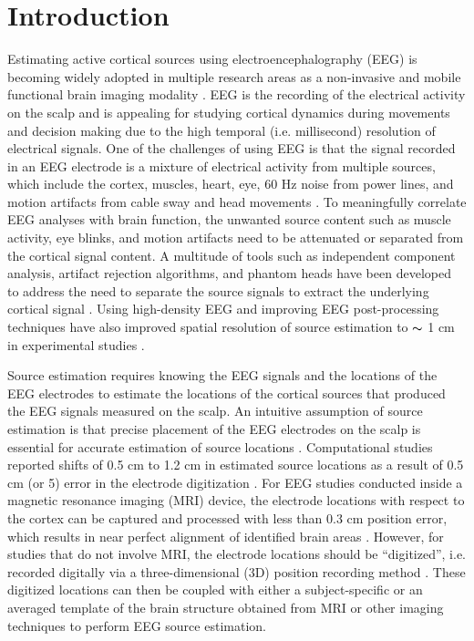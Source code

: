 \documentclass{UCF_ETD}
\renewcommand{\ul}{}
\begin{document}
\section{Introduction}
Estimating active cortical sources using electroencephalography (EEG) is becoming widely adopted in multiple research areas as a non-invasive and mobile functional brain imaging modality  \citep{Tsolaki2017-nt,Bradley2016-wg,Landsness2011-mr,Nystrom2008-ex}. EEG is the recording of the electrical activity on the scalp and is appealing for studying cortical dynamics during movements and decision making due to the high temporal (i.e. millisecond) resolution of electrical signals. One of the challenges of using EEG is that the signal recorded in an EEG electrode is a mixture of electrical activity from multiple sources, which include the cortex, muscles, heart, eye, 60 Hz noise from power lines, and motion artifacts from cable sway and head movements \citep{Kline2015-mf,Symeonidou2018-ge}. To meaningfully correlate EEG analyses with brain function, the unwanted source content such as muscle activity, eye blinks, and motion artifacts need to be attenuated or separated from the cortical signal content. A multitude of tools such as independent component analysis, artifact rejection algorithms, and phantom heads have been developed to address the need to separate the source signals to extract the underlying cortical signal \citep{Delorme2012-re,Mullen2013-xv,Artoni2014-jy,Oliveira2016-hy,Nordin2018-aq}. Using high-density EEG and improving EEG post-processing techniques have also improved spatial resolution of source estimation to $\thicksim$ 1 cm in experimental studies \citep{Seeber2019-dn,Hedrich2017-of,Klamer2015-yp,Scarff2004-ll,Lantz2003-om,He1989-dw}.

Source estimation requires knowing the EEG signals and the locations of the EEG electrodes to estimate the locations of the cortical sources that produced the EEG signals measured on the scalp. An intuitive assumption of source estimation is that precise placement of the EEG electrodes on the scalp is essential for accurate estimation of source locations \citep{Keil2014-mv}. Computational studies reported shifts of 0.5 cm to 1.2 cm in estimated source locations as a result of 0.5 cm (or 5\textdegree) error in the electrode digitization \citep{Kavanagk1978-zc,Khosla1999-bz,Wang2001-fp,Beltrachini2011-je,Akalin_Acar2013-rv}. For EEG studies conducted inside a magnetic resonance imaging (MRI) device, the electrode locations with respect to the cortex can be captured and processed \ul{with less than 0.3 cm position error}, which results in near perfect alignment of identified brain areas \citep{Marino2016-pu,Scarff2004-ll}. However, for studies that do not involve MRI, the electrode locations should be ``digitized'', i.e. recorded digitally via a three-dimensional (3D) position recording method \citep{Koessler2007-qg}. These digitized locations can then be coupled with either a subject-specific or an averaged template of the brain structure obtained from MRI or other imaging techniques to perform EEG source estimation.  
\end{document}
